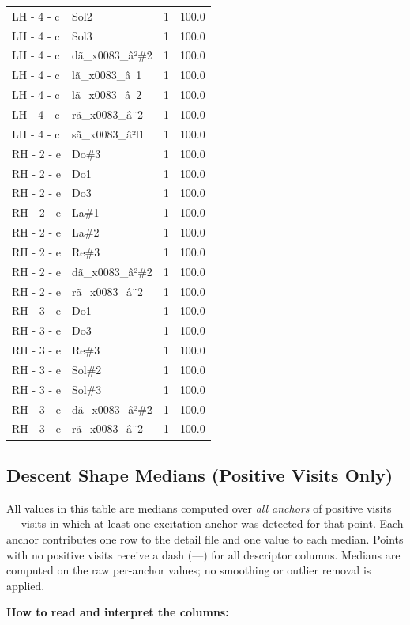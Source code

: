 \documentclass[a4paper,11pt]{article}
\begin{document}
\begin{footnotesize}
\begin{longtable}{p{3.5cm}p{7.5cm}rr}
LH - 4 - c & Sol2 & 1 & 100.0 \\
LH - 4 - c & Sol3 & 1 & 100.0 \\
LH - 4 - c & dã\_x0083\_â²\#2 & 1 & 100.0 \\
LH - 4 - c & lã\_x0083\_â 1 & 1 & 100.0 \\
LH - 4 - c & lã\_x0083\_â 2 & 1 & 100.0 \\
LH - 4 - c & rã\_x0083\_â¨2 & 1 & 100.0 \\
LH - 4 - c & sã\_x0083\_â²l1 & 1 & 100.0 \\
RH - 2 - e & Do\#3 & 1 & 100.0 \\
RH - 2 - e & Do1 & 1 & 100.0 \\
RH - 2 - e & Do3 & 1 & 100.0 \\
RH - 2 - e & La\#1 & 1 & 100.0 \\
RH - 2 - e & La\#2 & 1 & 100.0 \\
RH - 2 - e & Re\#3 & 1 & 100.0 \\
RH - 2 - e & dã\_x0083\_â²\#2 & 1 & 100.0 \\
RH - 2 - e & rã\_x0083\_â¨2 & 1 & 100.0 \\
RH - 3 - e & Do1 & 1 & 100.0 \\
RH - 3 - e & Do3 & 1 & 100.0 \\
RH - 3 - e & Re\#3 & 1 & 100.0 \\
RH - 3 - e & Sol\#2 & 1 & 100.0 \\
RH - 3 - e & Sol\#3 & 1 & 100.0 \\
RH - 3 - e & dã\_x0083\_â²\#2 & 1 & 100.0 \\
RH - 3 - e & rã\_x0083\_â¨2 & 1 & 100.0 \\
\end{longtable}
\end{footnotesize}

\subsection{Descent Shape Medians (Positive Visits Only)}

All values in this table are medians computed over \emph{all anchors} of positive visits ---
visits in which at least one excitation anchor was detected for that point. Each anchor
contributes one row to the detail file and one value to each median. Points with no positive
visits receive a dash (---) for all descriptor columns.
Medians are computed on the raw per-anchor values; no smoothing or outlier removal is
applied.

\medskip
\noindent\textbf{How to read and interpret the columns:}
\end{document}
